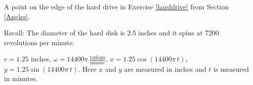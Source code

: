 {A point on the edge of the hard drive in Exercise \ref{harddrive} from Section \ref{Angles}.

Recall:  The diameter of the hard disk is 2.5 inches and it spins at 7200 revolutions per minute.}
{$r = 1.25$ inches, $\omega = 14400 \pi \, \frac{\text{radians}}{\text{minute}}$,  $x = 1.25 \cos(14400 \pi \, t)$, $y = 1.25 \sin(14400 \pi \, t)$.  Here $x$ and $y$ are measured in inches and $t$ is measured in minutes.}
